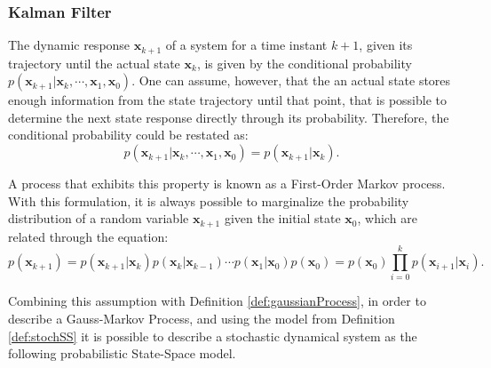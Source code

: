 \documentclass[a4paper,11pt]{book}
\numberwithin{figure}{chapter}
\numberwithin{equation}{chapter}
\numberwithin{table}{chapter}
\theoremstyle{definition}
\begin{document}
\subsubsection{Kalman Filter}

The dynamic response $\bm{x}_{k+1}$ of a system for a time instant $k+1$, given its trajectory until the actual state $\bm{x}_{k}$, is given by the conditional probability $p(\bm{x}_{k+1} | \bm{x}_{k}, \cdots, \bm{x}_1, \bm{x}_0)$. One can assume, however, that the an actual state stores enough information from the state trajectory until that point, that is possible to determine the next state response directly through its probability. Therefore, the conditional probability could be restated as:
\begin{equation}
    p(\bm{x}_{k+1} | \bm{x}_{k}, \cdots, \bm{x}_1, \bm{x}_0) =  p(\bm{x}_{k+1} | \bm{x}_{k})
.\end{equation}

A process that exhibits this property is known as a First-Order Markov process. With this formulation, it is always possible to marginalize the probability distribution of a random variable $\bm{x}_{k+1}$ given the initial state $\bm{x}_0$, which are related through the equation:
\begin{equation}
    p(\bm{x}_{k+1}) =  p(\bm{x}_{k+1} | \bm{x}_{k}) p(\bm{x}_{k} | \bm{x}_{k-1}) \cdots p(\bm{x}_{1} | \bm{x}_{0})p(\bm{x}_0) = p(\bm{x}_0) \prod_{i=0}^k p(\bm{x}_{i+1} | \bm{x}_{i})
.\end{equation}

\noindent Combining this assumption with Definition \ref{def:gaussianProcess}, in order to describe a Gauss-Markov Process, and using the model from Definition \ref{def:stochSS} it is possible to describe a stochastic dynamical system as the following probabilistic State-Space model.
\end{document}
